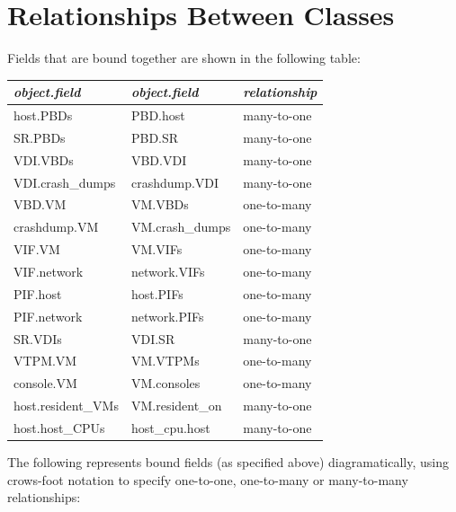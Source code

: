 \section{Relationships Between Classes}
Fields that are bound together are shown in the following table: 
\begin{center}\begin{tabular}{|ll|l|}
\hline
{\em object.field} & {\em object.field} & {\em relationship} \\

\hline
host.PBDs & PBD.host & many-to-one\\
SR.PBDs & PBD.SR & many-to-one\\
VDI.VBDs & VBD.VDI & many-to-one\\
VDI.crash\_dumps & crashdump.VDI & many-to-one\\
VBD.VM & VM.VBDs & one-to-many\\
crashdump.VM & VM.crash\_dumps & one-to-many\\
VIF.VM & VM.VIFs & one-to-many\\
VIF.network & network.VIFs & one-to-many\\
PIF.host & host.PIFs & one-to-many\\
PIF.network & network.PIFs & one-to-many\\
SR.VDIs & VDI.SR & many-to-one\\
VTPM.VM & VM.VTPMs & one-to-many\\
console.VM & VM.consoles & one-to-many\\
host.resident\_VMs & VM.resident\_on & many-to-one\\
host.host\_CPUs & host\_cpu.host & many-to-one\\
\hline
\end{tabular}\end{center}

The following represents bound fields (as specified above) diagramatically, using crows-foot notation to specify one-to-one, one-to-many or many-to-many
                   relationships:

\begin{center}\end{center}
\
